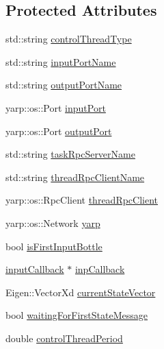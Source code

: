 \subsection*{Protected Attributes}
\begin{DoxyCompactItemize}
\item 
std\+::string \hyperlink{classocra__recipes_1_1ControlThread_aa8c8f3c06e3e2f22a0d46814f067ec79}{control\+Thread\+Type}
\item 
std\+::string \hyperlink{classocra__recipes_1_1ControlThread_a4979cfd87cd758473a2ec367f47be17f}{input\+Port\+Name}
\item 
std\+::string \hyperlink{classocra__recipes_1_1ControlThread_a150b524cf8af131ac4d7a497777a2d87}{output\+Port\+Name}
\item 
yarp\+::os\+::\+Port \hyperlink{classocra__recipes_1_1ControlThread_a3c6a392da512677af0b6c20f5ed357c1}{input\+Port}
\item 
yarp\+::os\+::\+Port \hyperlink{classocra__recipes_1_1ControlThread_acf573eaf6f1d78918b95cabfb110bbaa}{output\+Port}
\item 
std\+::string \hyperlink{classocra__recipes_1_1ControlThread_abbc082e54db816a3298c3e5ae5d3f9ef}{task\+Rpc\+Server\+Name}
\item 
std\+::string \hyperlink{classocra__recipes_1_1ControlThread_af9d8abd531163281ac938eeb0ba51979}{thread\+Rpc\+Client\+Name}
\item 
yarp\+::os\+::\+Rpc\+Client \hyperlink{classocra__recipes_1_1ControlThread_a7c63f87c66ca64787e6f798a7db28e20}{thread\+Rpc\+Client}
\item 
yarp\+::os\+::\+Network \hyperlink{classocra__recipes_1_1ControlThread_ab256274135229afc7017b088424b5b3b}{yarp}
\item 
bool \hyperlink{classocra__recipes_1_1ControlThread_ae459f7c503830d9ae1c0015d8613ea87}{is\+First\+Input\+Bottle}
\item 
\hyperlink{classocra__recipes_1_1ControlThread_1_1inputCallback}{input\+Callback} $\ast$ \hyperlink{classocra__recipes_1_1ControlThread_af8da6d1e1079de5d0b53dc6bbad75055}{inp\+Callback}
\item 
Eigen\+::\+Vector\+Xd \hyperlink{classocra__recipes_1_1ControlThread_afa7f90785f2768cc74b5043044d09912}{current\+State\+Vector}
\item 
bool \hyperlink{classocra__recipes_1_1ControlThread_aaef2c765c3900ebc72125f7a8fd4240e}{waiting\+For\+First\+State\+Message}
\item 
double \hyperlink{classocra__recipes_1_1ControlThread_affbc4af946e3c2eabd2ce1cf30376bf2}{control\+Thread\+Period}

\end{DoxyCompactItemize}
